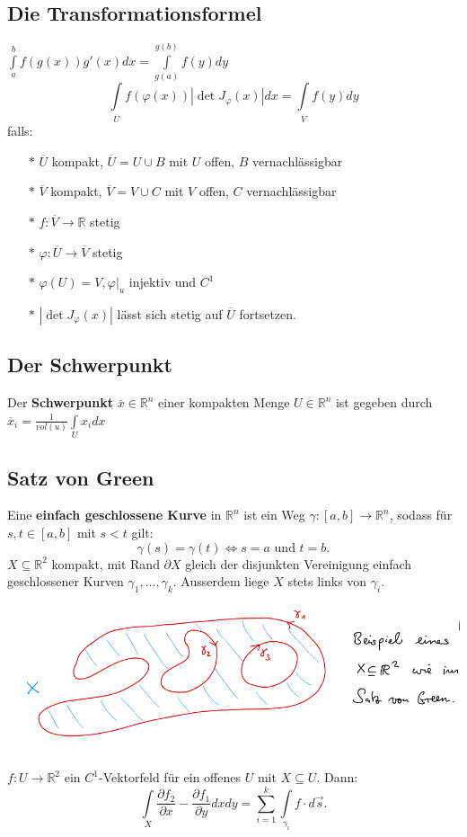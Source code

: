\subsection{Die Transformationsformel}
    $\int\limits_a^bf(g(x))g'(x)dx=\int\limits_{g(a)}^{g(b)}f(y)dy$\\
    $$\int\limits_{\overline U}f(\varphi(x))|\det
    J_\varphi(x)|dx=\int\limits_{\overline V}f(y)dy$$
    falls:\begin{enumerate}
      \item[$*$] $\overline U$ kompakt, $\overline U=U\cup B$ mit $U$ offen, $B$
        vernachlässigbar
      \item[$*$] $\overline V$ kompakt, $\overline V=V\cup C$ mit $V$ offen, $C$
        vernachlässigbar
      \item[$*$] $f:\overline V\rightarrow\mathbb R$ stetig
      \item[$*$] $\varphi:\overline U\rightarrow\overline V$ stetig
      \item[$*$] $\varphi(U)=V, \varphi|_u$ injektiv und $C^1$
      \item[$*$] $|\det J_\varphi(x)|$ lässt sich stetig auf $\overline U$
        fortsetzen.
    \end{enumerate}
\subsection{Der Schwerpunkt}
    Der \textbf{Schwerpunkt} $\overline x\in\mathbb R^n$ einer kompakten Menge
    $U\in\mathbb R^n$ ist gegeben durch $\overline
    x_i=\frac{1}{vol(u)}\int\limits_Ux_idx$
\subsection{Satz von Green}
    Eine \textbf{einfach geschlossene Kurve} in $\mathbb R^n$ ist ein Weg
    $\gamma:[a,b]\rightarrow\mathbb R^n$, sodass für $s,t\in[a,b]$ mit $s<t$
    gilt: $$\gamma(s)=\gamma(t)\iff s=a\text{ und } t=b.$$
    $X\subseteq\mathbb R^2$ kompakt, mit Rand $\partial X$ gleich der disjunkten
    Vereinigung einfach geschlossener Kurven $\gamma_1,...,\gamma_k$. Ausserdem
    liege $X$ stets links von $\gamma_i$.
  \begin{minipage}{\linewidth}
    \includegraphics[width=\linewidth]{./media/satz_von_green.png}
  \end{minipage}
  $f:U\rightarrow\mathbb R^2$ ein $C^1$-Vektorfeld für ein offenes $U$ mit
  $X\subseteq U$. Dann: $$\int\limits_X\frac{\partial f_2}{\partial
  x}-\frac{\partial f_1}{\partial y}dxdy =
  \sum\limits_{i=1}^k\int\limits_{\gamma_i}f\cdot d\overrightarrow s.$$
  \vfil\null
